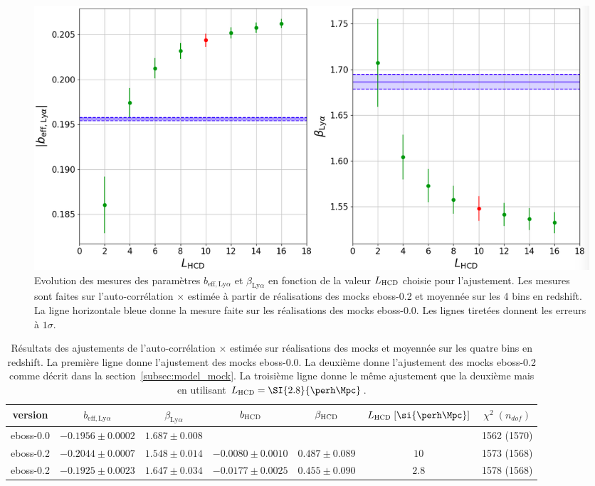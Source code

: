 \begin{figure}
  \centering
  \includegraphics[scale=0.33]{bias_lya_vs_L0}
  \caption{Evolution des mesures des paramètres $b_{\mathrm{eff},\mathrm{Ly}\alpha}$ et $\beta_{\mathrm{Ly}\alpha}$ en fonction de la valeur $L_{\textsc{HCD}}$ choisie pour l'ajustement.
    Les mesures sont faites sur l'auto-corrélation \lya{}$\times$\lya{} estimée à partir de \Nmocks{} réalisations des mocks eboss-0.2 et moyennée sur les 4 bins en redshift. La ligne horizontale bleue donne la mesure faite sur les \Nmocks réalisations des mocks eboss-0.0. Les lignes tiretées donnent les erreurs à $1 \sigma$.}
  \label{fig:bias_lya_vs_L0}
\end{figure}

\begin{table}[]
  \centering
  \caption{Résultats des ajustements de l'auto-corrélation \lya{}$\times$\lya{} estimée sur \Nmocks réalisations des mocks et moyennée sur les quatre bins en redshift. La première ligne donne l'ajustement des mocks eboss-0.0. La deuxième donne l'ajustement des mocks eboss-0.2 comme décrit dans la section~\ref{subsec:model_mock}. La troisième ligne donne le même ajustement que la deuxième mais en utilisant $L_{\textsc{HCD}} = \SI{2.8}{\perh\Mpc}$.}
  \label{tab:cf_eboss02_L028}
  \footnotesize
  \begin{tabular}{ccccccc}
    \toprule
    version & $b_{\mathrm{eff},\mathrm{Ly}\alpha}$ & $\beta_{\mathrm{Ly}\alpha}$ & $b_{\textsc{HCD}}$ & $\beta_{\textsc{HCD}}$ & $L_{\textsc{HCD}}\;[\si{\perh\Mpc}]$ & $\chi^2 \; (n_{dof})$ \\
    \midrule
    eboss-0.0 & $-0.1956 \pm 0.0002$ & $1.687 \pm 0.008$ & & & & 1562 (1570) \\
    eboss-0.2 & $-0.2044 \pm 0.0007$ & $1.548 \pm 0.014$ & $-0.0080 \pm 0.0010$ & $0.487 \pm 0.089$ & $10$ & 1573 (1568) \\
    eboss-0.2 & $-0.1925 \pm 0.0023$ & $ 1.647 \pm 0.034$ &  $-0.0177 \pm 0.0025$ & $ 0.455 \pm 0.090$ & $2.8$ & 1578 (1568) \\ 
    \bottomrule
  \end{tabular}
\end{table}

